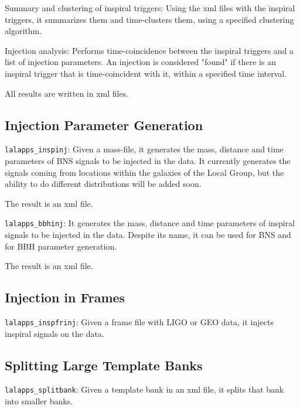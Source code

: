 Summary and clustering of inspiral triggers: Using the xml files with the
inspiral triggers, it summarizes them and time-clusters them, using a
specified clustering algorithm.

Injection analysis: Performs time-coincidence between  the inspiral triggers 
and a list of injection parameters. An injection is considered "found" if
there is an inspiral trigger that is time-coincident with it, within a 
specified time interval.

All results are written in xml files.

\subsection{Injection Parameter Generation}

\texttt{lalapps\_inspinj}: Given a mass-file, it generates the mass,
  distance and time parameters of BNS signals to be injected in the data.
  It currently generates the signals coming from locations within the
  galaxies of the Local Group, but the ability to do different distributions
  will be added soon.

  The result is an xml file.

\texttt{lalapps\_bbhinj}: It generates the mass,
  distance and time parameters of inspiral signals to be injected in the data.
  Despite its name, it can be used for BNS and for BBH parameter generation.

  The result is an xml file.

\subsection{Injection in Frames}

\texttt{lalapps\_inspfrinj}: Given a frame file with LIGO or GEO data, it
injects inspiral signals on the data.


\subsection{Splitting Large Template Banks}

\texttt{lalapps\_splitbank}: Given a template bank in an xml file, it splits
that bank into smaller banks.

\clearpage


\clearpage


\clearpage


\clearpage


